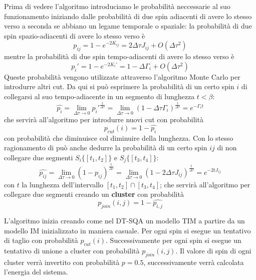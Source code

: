 Prima di vedere l'algoritmo introduciamo le probabilità neccessarie al suo funzionamento iniziando dalle probabilità di due spin adiacenti di avere lo stesso verso a seconda se abbiano un legame temporale o spaziale:
la probabilità di due spin spazio-adiacenti di avere lo stesso verso è
$$p_{ij} = 1 - e^{-2K_{ij}} = 2\Delta \tau J_{ij} + O(\Delta \tau^2)$$
mentre la probabilità di due spin tempo-adiacenti di avere lo stesso verso è
$$p_i' = 1 - e^{-2K_{i}'} = 1 - \Delta \Gamma_{i} + O(\Delta \tau^2)$$
Queste probabilità vengono utilizzate attraverso l'algoritmo Monte Carlo per introdurre altri cut.
Da qui si può esprimere la probabilità di un certo spin $i$ di collegarsi al suo tempo-adiacente in un segmento di lunghezza $t < \beta$:
$$\hat{p_i} = \lim_{\Delta \tau \to 0} p_i'^{\frac{t}{\Delta \tau}} = \lim_{\Delta \tau \to 0} (1 - \Delta \tau \Gamma_i)^\frac{t}{\Delta \tau} = e^{- \Gamma_i t}$$
che servirà all'algoritmo per introdurre nuovi cut con probabilità
$$p_{cut}(i) = 1 - \hat{p_i}$$
con probabilità che diminuisce col diminuire della lunghezza.
Con lo stesso ragionamento di può anche dedurre la probabilità di un certo spin $ij$ di non collegare due segmenti $S_i\{[t_1, t_2]\}$ e $S_j\{[t_3, t_4]\}$:
$$\hat{p_{ij}} = \lim_{\Delta \tau \to 0} (1 - p_{ij})^\frac{t}{\Delta \tau} = \lim_{\Delta \tau \to 0} (1 - 2\Delta \tau J_{ij})^\frac{t}{\Delta \tau} = e^{-2 t J_{ij}}$$
con $t$ la lunghezza dell'intervallo $[t_1, t_2] \cap [t_3, t_4]$; che servirà all'algoritmo per collegare due segmenti creando un \textbf{cluster} con probabilità
$$p_{join}(i,j) = 1 - \hat{p_{i,j}}$$

L'algoritmo inizia creando come nel DT-SQA un modello TIM a partire da un modello IM inizializzato in maniera casuale. Per ogni spin si esegue un tentativo di taglio con probabilità $p_{cut}(i)$. Successivamente per ogni spin si esegue un tentativo di unione a cluster con probabilità $p_{join}(i,j)$. Il valore di spin di ogni cluster verrà invertito con probabilità $p = 0.5$, successivamente verrà calcolata l'energia del sistema.

